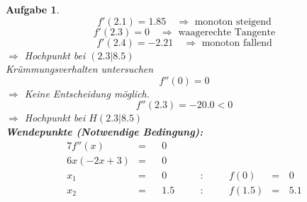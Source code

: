 \documentclass[12pt]{article}
\theoremstyle{note}
\newtheorem{aufgabe}{Aufgabe}
\begin{document}
\begin{flushleft}
\begin{aufgabe}
\vspace{1em}$$f'(2.1)=1.85\quad \Rightarrow \text{ monoton steigend} $$$$f'(2.3)=0 \quad \Rightarrow \text{ waagerechte Tangente} $$$$f'(2.4)=-2.21\quad \Rightarrow \text{ monoton fallend} $$$\Rightarrow$ Hochpunkt bei $(2.3|8.5)$ \\ 
\vspace{1em}{\em 3. M\"oglichkeit:} Kr\"ummungsverhalten untersuchen \\ 
$$f''(0)=0$$ 
$\Rightarrow$ Keine Entscheidung m\"oglich. \\ 
$$f''(2.3)=-20.0< 0 $$ 
$\Rightarrow$ Hochpunkt bei $H(2.3|8.5)$ \\ 
{\bf Wendepunkte (Notwendige Bedingung):} 
\begin{alignat*}{7} 
f''(x)&=& &0& \\ 
6 x \left(- 2 x + 3\right)&=& &0& \\ 
x_1&=& &0& \quad &:& \quad &f(0)&=& \,0\\ 
x_2&=& &1.5& \quad &:& \quad &f(1.5)&=& \,5.1\\ 
\end{alignat*} 


\end{aufgabe}
\end{flushleft}
\end{document}
